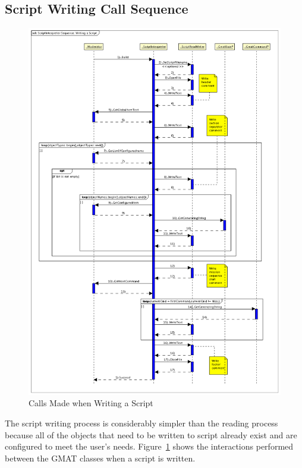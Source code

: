 \subsection{\label{section:SIWriteSequence}Script Writing Call Sequence}

\begin{figure}
\begin{center}
\includegraphics[395,575]{Images/ScriptInterpreterSequenceWritingaScript.png}
\caption{\label{figure:InterpreterWriteSequence}Calls Made when Writing a Script}
\end{center}
\end{figure}

The script writing process is considerably simpler than the reading process because all of the
objects that need to be written to script already exist and are configured to meet the user's
needs.  Figure~\ref{figure:InterpreterWriteSequence} shows the interactions performed between the
GMAT classes when a script is written.

